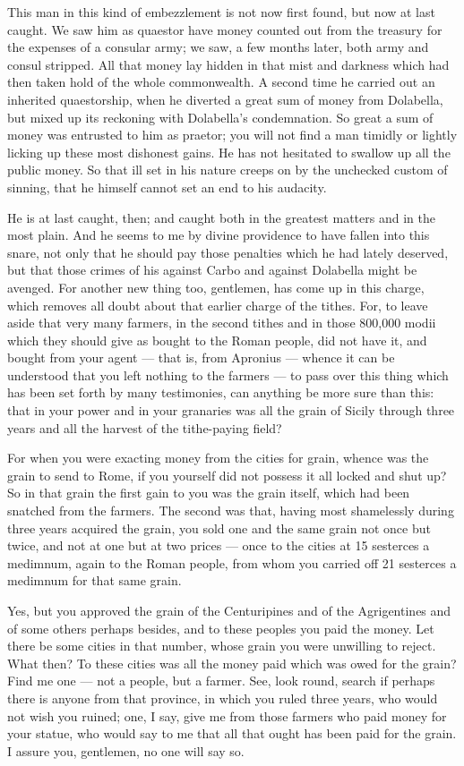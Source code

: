  This man in this kind of embezzlement is not now first found, but now at last caught. We saw him as quaestor have money counted out from the treasury for the expenses of a consular army; we saw, a few months later, both army and consul stripped. All that money lay hidden in that mist and darkness which had then taken hold of the whole commonwealth. A second time he carried out an inherited quaestorship, when he diverted a great sum of money from Dolabella, but mixed up its reckoning with Dolabella's condemnation. So great a sum of money was entrusted to him as praetor; you will not find a man timidly or lightly licking up these most dishonest gains. He has not hesitated to swallow up all the public money. So that ill set in his nature creeps on by the unchecked custom of sinning, that he himself cannot set an end to his audacity.

 He is at last caught, then; and caught both in the greatest matters and in the most plain. And he seems to me by divine providence to have fallen into this snare, not only that he should pay those penalties which he had lately deserved, but that those crimes of his against Carbo and against Dolabella might be avenged. For another new thing too, gentlemen, has come up in this charge, which removes all doubt about that earlier charge of the tithes. For, to leave aside that very many farmers, in the second tithes and in those 800,000 modii which they should give as bought to the Roman people, did not have it, and bought from your agent --- that is, from Apronius --- whence it can be understood that you left nothing to the farmers --- to pass over this thing which has been set forth by many testimonies, can anything be more sure than this: that in your power and in your granaries was all the grain of Sicily through three years and all the harvest of the tithe-paying field?

 For when you were exacting money from the cities for grain, whence was the grain to send to Rome, if you yourself did not possess it all locked and shut up? So in that grain the first gain to you was the grain itself, which had been snatched from the farmers. The second was that, having most shamelessly during three years acquired the grain, you sold one and the same grain not once but twice, and not at one but at two prices --- once to the cities at 15 sesterces a medimnum, again to the Roman people, from whom you carried off 21 sesterces a medimnum for that same grain.

 Yes, but you approved the grain of the Centuripines and of the Agrigentines and of some others perhaps besides, and to these peoples you paid the money. Let there be some cities in that number, whose grain you were unwilling to reject. What then? To these cities was all the money paid which was owed for the grain? Find me one --- not a people, but a farmer. See, look round, search if perhaps there is anyone from that province, in which you ruled three years, who would not wish you ruined; one, I say, give me from those farmers who paid money for your statue, who would say to me that all that ought has been paid for the grain. I assure you, gentlemen, no one will say so.

